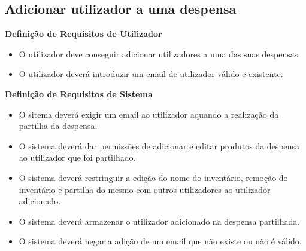 \documentclass[a4paper]{report}
\begin{document}
        \subsection{Adicionar utilizador a uma despensa}
            \textbf{Definição de Requisitos de Utilizador}
            \begin{itemize}
                \item O utilizador deve conseguir adicionar utilizadores
                a uma das suas despensas.
                \item O utilizador deverá introduzir um email de utilizador
                válido e existente.
            \end{itemize}
            \textbf{Definição de Requisitos de Sistema}
            \begin{itemize}
                \item O sitema deverá exigir um email ao utilizador
                aquando a realização da partilha da despensa.
                \item O sistema deverá dar permissões de adicionar e editar
                produtos da despensa ao utilizador que foi partilhado.
                \item O sistema deverá restringuir a edição do nome do
                inventário, remoção do inventário e partilha do mesmo com
                outros utilizadores ao utilizador adicionado.
                \item O sistema deverá armazenar o utilizador adicionado
                na despensa partilhada.
                \item O sistema deverá negar a adição de um email que não
                existe ou não é válido.
            \end{itemize}
\end{document}
